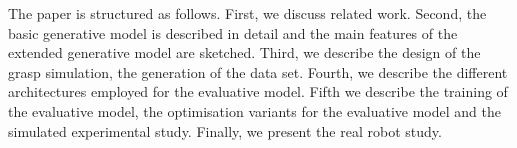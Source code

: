 
The paper is structured as follows. First, we discuss related work. Second, the basic generative model is described in detail and the main features of the extended generative model are sketched. Third, we describe the design of the grasp simulation, the generation of the data set. Fourth, we describe the different architectures employed for the evaluative model. Fifth we describe the training of the evaluative model, the optimisation variants for the evaluative model and the simulated experimental study. Finally, we present the real robot study.
